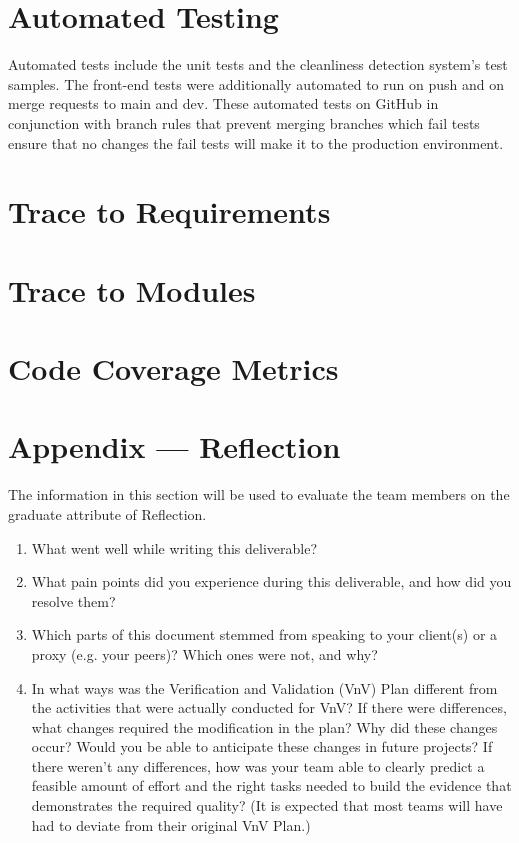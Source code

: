 \documentclass[12pt, titlepage]{article}
\begin{document}
\section{Automated Testing}
Automated tests include the unit tests and the cleanliness detection system's test samples. The front-end tests were additionally automated to run on push and on merge requests to main and dev. These automated tests on GitHub in conjunction with branch rules that prevent merging branches which fail tests ensure that no changes the fail tests will make it to the production environment.
		
\section{Trace to Requirements}
		
\section{Trace to Modules}		

\section{Code Coverage Metrics}




\newpage{}
\section*{Appendix --- Reflection}

The information in this section will be used to evaluate the team members on the
graduate attribute of Reflection.



\begin{enumerate}
  \item What went well while writing this deliverable? 
  \item What pain points did you experience during this deliverable, and how
    did you resolve them?
  \item Which parts of this document stemmed from speaking to your client(s) or
  a proxy (e.g. your peers)? Which ones were not, and why?
  \item In what ways was the Verification and Validation (VnV) Plan different
  from the activities that were actually conducted for VnV?  If there were
  differences, what changes required the modification in the plan?  Why did
  these changes occur?  Would you be able to anticipate these changes in future
  projects?  If there weren't any differences, how was your team able to clearly
  predict a feasible amount of effort and the right tasks needed to build the
  evidence that demonstrates the required quality?  (It is expected that most
  teams will have had to deviate from their original VnV Plan.)
\end{enumerate}
\end{document}
